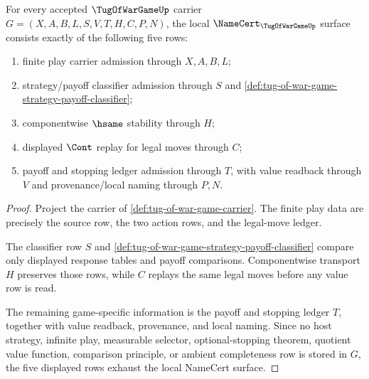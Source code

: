 \begin{theorem}
\label{thm:tug-of-war-game-carrier-obligation}
For every accepted $\TugOfWarGameUp$ carrier $G=(X,A,B,L,S,V,T,H,C,P,N)$, the local $\NameCert_{\TugOfWarGameUp}$ surface consists exactly of the following five rows:
\begin{enumerate}
\item finite play carrier admission through $X,A,B,L$;
\item strategy/payoff classifier admission through $S$ and \autoref{def:tug-of-war-game-strategy-payoff-classifier};
\item componentwise $\hsame$ stability through $H$;
\item displayed $\Cont$ replay for legal moves through $C$;
\item payoff and stopping ledger admission through $T$, with value readback through $V$ and provenance/local naming through $P,N$.
\end{enumerate}
\end{theorem}
\begin{proof}
Project the carrier of \autoref{def:tug-of-war-game-carrier}. The finite play data are precisely the source row, the two action rows, and the legal-move ledger.

The classifier row $S$ and \autoref{def:tug-of-war-game-strategy-payoff-classifier} compare only displayed response tables and payoff comparisons. Componentwise transport $H$ preserves those rows, while $C$ replays the same legal moves before any value row is read.

The remaining game-specific information is the payoff and stopping ledger $T$, together with value readback, provenance, and local naming. Since no host strategy, infinite play, measurable selector, optional-stopping theorem, quotient value function, comparison principle, or ambient completeness row is stored in $G$, the five displayed rows exhaust the local NameCert surface.
\end{proof}

